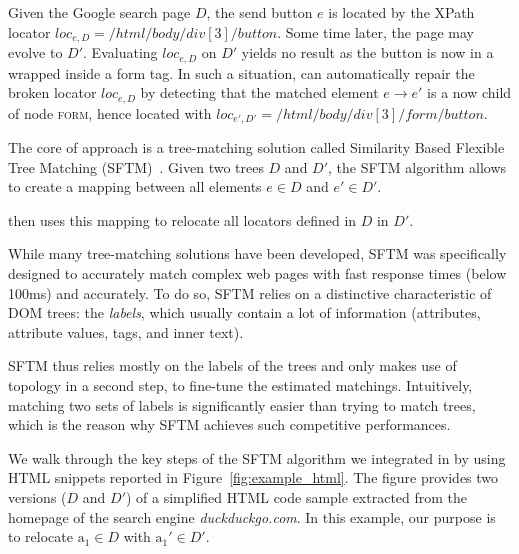 \documentclass[10pt,conference]{IEEEtran}
\begin{document}
\begin{ex}
Given the Google search page $D$, the send button $e$ is located by the XPath locator $loc_{e,D} = /html/body/div[3]/button$.
Some time later, the page may evolve to $D'$.
Evaluating $loc_{e,D}$ on $D'$ yields no result as the button is now in a wrapped inside a \textsf{form} tag.
In such a situation, \erratum{} can automatically repair the broken locator $loc_{e,D}$ by detecting that the matched element $e \to e'$ is a now child of node \textsc{form}, hence located with $loc_{e',D'} = /html/body/div[3]/form/button$.
\end{ex}

The core of \erratum approach is a tree-matching solution called Similarity Based Flexible Tree Matching (SFTM)~\cite{brisset2020sftm}. 
Given two trees $D$ and $D'$, the SFTM algorithm allows to create a mapping between all elements $e \in D$ and $e' \in D'$.

\erratum then uses this mapping to relocate all locators defined in $D$ in $D'$.

While many tree-matching solutions have been developed, SFTM was specifically designed to accurately match complex web pages with fast response times (below 100ms) and accurately.
To do so, SFTM relies on a distinctive characteristic of DOM trees: the \emph{labels}, which usually contain a lot of information (attributes, attribute values, tags, and inner text).

SFTM thus relies mostly on the labels of the trees and only makes use of topology in a second step, to fine-tune the estimated matchings.
Intuitively, matching two sets of labels is significantly easier than trying to match trees, which is the reason why SFTM achieves such competitive performances.

We walk through the key steps of the SFTM algorithm we integrated in \erratum{} by using HTML snippets reported in Figure~\ref{fig:example_html}.
The figure provides two versions ($D$ and $D'$) of a simplified HTML code sample extracted from the homepage of the search engine \textit{duckduckgo.com}.
In this example, our purpose is to relocate $\text{a}_1 \in D$ with $\text{a}_1' \in D'$.
\end{document}
